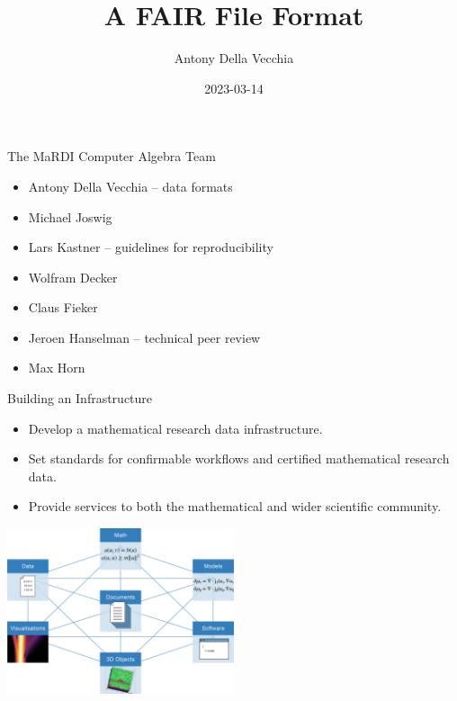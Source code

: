 \documentclass[9pt]{beamer}
\author{Antony Della Vecchia}
\title{A FAIR File Format}
\institute[]{
Technische Universit\"at Berlin
}
\date{
2023-03-14
}
\theoremstyle{definition}
\begin{document}
\maketitle

\begin{frame}[fragile]{The MaRDI Computer Algebra Team}
  \begin{tcolorbox}[title={TU Berlin}]
    \begin{itemize}
    \item Antony Della Vecchia -- data formats
    \item Michael Joswig
    \item Lars Kastner -- guidelines for reproducibility
    \end{itemize}
  \end{tcolorbox}

  \begin{tcolorbox}[title={TU Kaiserslautern}]
    \begin{itemize}
    \item Wolfram Decker
    \item Claus Fieker
    \item Jeroen Hanselman -- technical peer review
    \item Max Horn
    \end{itemize}
  \end{tcolorbox}
\end{frame}



\begin{frame}[fragile]{Building an Infrastructure}
  \begin{itemize}
  \item Develop a mathematical research data infrastructure.
  \item Set standards for confirmable workflows and certified mathematical research data.
  \item Provide services to both the mathematical and wider scientific community.
  \end{itemize}
  \begin{center}
    \includegraphics[width=0.5\textwidth, height=0.5\textheight]{images/graph}
  \end{center}
\end{frame}
\end{document}
